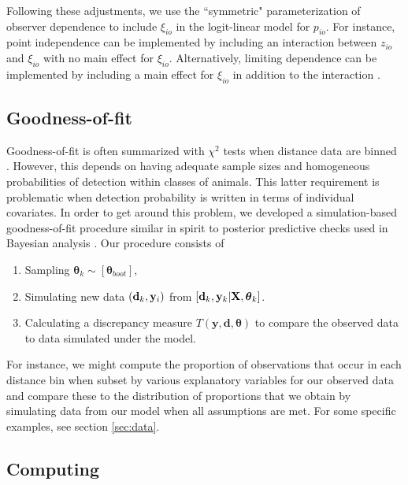 \documentclass[12pt,fleqn]{article}
\begin{document}
Following these adjustments, we use the ``symmetric" parameterization \citep{MacKenzieClement2016} of observer dependence to include $\xi_{io}$ in the logit-linear model for $p_{io}$.  For instance, point independence \citep{LaakeBorchers2004,BucklandEtAl2010} can be implemented by including an interaction between $z_{io}$ and $\xi_{io}$ with no main effect for $\xi_{io}$.  Alternatively, limiting dependence \citep{BucklandEtAl2010} can be implemented by including a main effect for $\xi_{io}$ in addition to the interaction \citep{MacKenzieClement2016}.

\subsection{Goodness-of-fit}

Goodness-of-fit is often summarized with $\chi^2$ tests when distance data are binned \citep{BurnhamEtAl2004}.  However, this depends on having adequate sample sizes and homogeneous probabilities of detection within classes of animals. This latter requirement is problematic when detection probability is written in terms of individual covariates.  In order to get around this problem, we developed a simulation-based goodness-of-fit procedure similar in spirit to posterior predictive checks used in Bayesian analysis \citep[e.g.][]{GelmanEtAl2014}.  Our procedure consists of
\begin{enumerate}
  \item Sampling $\boldsymbol{\theta}_k \sim [\boldsymbol{\theta}_{boot}]$,
  \item Simulating new data $({\bf d}_k, {\bf y}_i)$ from $[{\bf d}_k,{\bf y}_k | {\bf X},\boldsymbol{\theta}_k]$.
  \item Calculating a discrepancy measure $T(\textbf{y},\textbf{d},\boldsymbol{\theta})$ to compare the observed data to data simulated under the model.
\end{enumerate}
For instance, we might compute the proportion of observations that occur in each distance bin when subset by various explanatory variables for our observed data and compare these to the distribution of proportions that we obtain by simulating data from our model when all assumptions are met.  For some specific examples, see section \ref{sec:data}.

\subsection{Computing}
\end{document}
